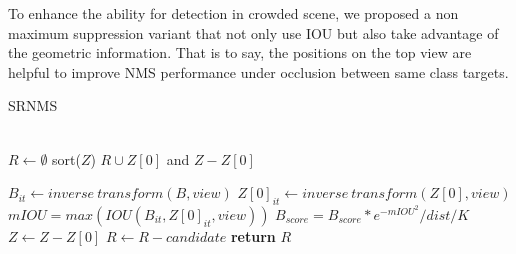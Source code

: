 \documentclass[journal]{IEEEtran}
\begin{document}
To enhance the ability for detection in crowded scene, we proposed a non maximum suppression variant that not only use IOU but also take advantage of the geometric information. That is to say, the positions on the top view are helpful to improve NMS performance under occlusion between same class targets.
\begin{algorithm}
\caption{SRNMS}
\label{alg:A}

\begin{algorithmic}




\\\hrulefill
\State $R \gets \emptyset$
\State sort($Z$)
\State $R \cup Z[0]$ and $Z - Z[0]$

\State $B_{it}\gets inverse \ transform(B, view)$
\State $Z[0]_{it}\gets inverse \ transform(Z[0], view)$
\State  $mIOU=max(IOU(B_{it},Z[0]_{it},view))$
\State   $B_{score} = B_{score}*e^{-mIOU^2}/dist/K$
\EndIf
\State $Z\gets Z - Z[0]$
\EndFor
\EndFor
\EndWhile
{}
        \State  $R\gets R - candidate$
    \EndIf
\EndFor
\State \textbf{return} $R$
\end{algorithmic}
\end{algorithm}


%
\end{document}
